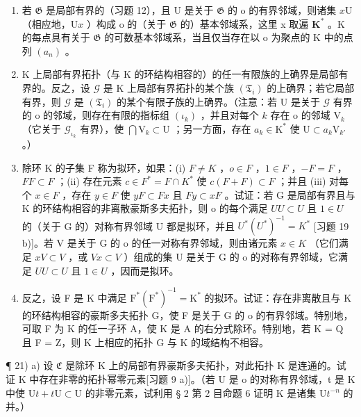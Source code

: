 \begin{enumerate}
\def\labelenumi{\alph{enumi})}
\setcounter{enumi}{1}
\item
  若 \(\mathfrak{G}\) 是局部有界的（习题 12），且 U 是关于 \(\mathfrak{G}\) 的 o 的有界邻域，则诸集 \(x\mathrm{U}\) （相应地，\(\mathrm{U}x\) ）构成 o 的（关于 \(\mathfrak{G}\) 的）基本邻域系，这里 x 取遍 \(\mathbf{K}^*\) 。K 的每点具有关于 \(\mathfrak{G}\) 的可数基本邻域系，当且仅当存在以 o 为聚点的 K 中的点列 \((a_n)\) 。
\item
  K 上局部有界拓扑（与 K 的环结构相容的）的任一有限族的上确界是局部有界的。反之，设 \(\mathcal{G}\) 是 K 上局部有界拓扑的某个族 \((\mathfrak{T}_i)\) 的上确界；若它局部有界，则 \(\mathcal{G}\) 是 \((\mathfrak{T}_i)\) 的某个有限子族的上确界。（注意：若 U 是关于 \(\mathcal{G}\) 有界的 o 的邻域，则存在有限的指标组 \((\iota_k)\) ，并且对每个 \(k\) 存在 o 的邻域 \(\mathrm{V}_k\) （它关于 \(\mathcal{G}_{\iota_k}\) 有界），使 \(\bigcap \mathrm{V}_k \subset \mathrm{U}\) ；另一方面，存在 \(a_k \in \mathrm{K}^*\) 使 \(\mathrm{U} \subset a_k \mathrm{V}_{k'}\) 。）
\item
  除环 K 的子集 F 称为拟环，如果：(i) \(F \neq K\) ，\(o \in F\) ，\(1 \in F\) ，\(-F = F\) ，\(FF \subset F\) ；(ii) 存在元素 \(c \in F^{*} = F \cap K^{*}\) 使 \(c(F + F) \subset F\) ；并且 (iii) 对每个 \(x \in F\) ，存在 \(y \in F\) 使 \(yF \subset Fx\) 且 \(Fy \subset xF\) 。试证：若 G 是局部有界且与 K 的环结构相容的非离散豪斯多夫拓扑，则 o 的每个满足 \(UU \subset U\) 且 \(1 \in U\) 的（关于 G 的）对称有界邻域 U 都是拟环，并且 \(U^{*}(U^{*})^{-1} = K^{*}\) {[}习题 19 b){]}。若 V 是关于 G 的 o 的任一对称有界邻域，则由诸元素 \(x \in K\) （它们满足 \(xV \subset V\) ，或 \(Vx \subset V\) ）组成的集 U 是关于 G 的 o 的对称有界邻域，它满足 \(UU \subset U\) 且 \(1 \in U\) ，因而是拟环。
\item
  反之，设 F 是 K 中满足 \(\mathrm{F}^{*}(\mathrm{F}^{*})^{-1} = \mathrm{K}^{*}\) 的拟环。试证：存在非离散且与 K 的环结构相容的豪斯多夫拓扑 G，使 F 是关于 G 的 o 的有界邻域。特别地，可取 F 为 K 的任一子环 A，使 K 是 A 的右分式除环。特别地，若 K = Q 且 F = Z，则 K 上相应的拓扑 G 与 K 的域结构不相容。
\end{enumerate}

¶ 21) a) 设 \(\mathfrak{C}\) 是除环 K 上的局部有界豪斯多夫拓扑，对此拓扑 K 是连通的。试证 K 中存在非零的拓扑幂零元素{[}习题 9 a){]}。（若 U 是 o 的对称有界邻域，t 是 K 中使 \(\mathrm{U}t + t\mathrm{U} \subset \mathrm{U}\) 的非零元素，试利用 § 2 第 2 目命题 6 证明 K 是诸集 \(\mathrm{U}t^{-n}\) 的并。）

